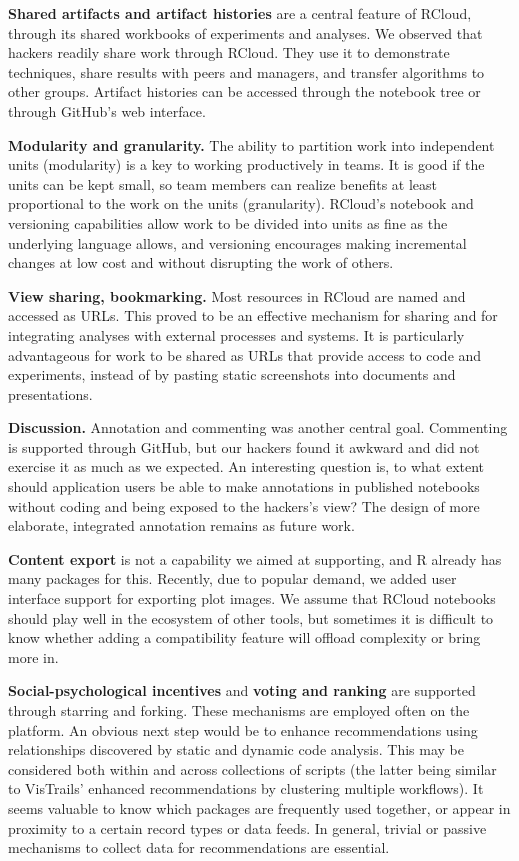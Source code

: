 {\bf Shared artifacts and artifact histories} are a central feature of
RCloud, through its shared workbooks of experiments and analyses.  We
observed that hackers readily share work through RCloud. They use it to
demonstrate techniques, share results with peers and managers, and transfer algorithms
to other groups.  Artifact histories can be accessed through the notebook
tree or through GitHub's web interface.

{\bf Modularity and granularity.} The ability to partition work into
independent units (modularity) is a key to working productively in teams.
It is good if the units can be kept small, so team members can realize
benefits at least proportional to the work on the units (granularity).
RCloud's notebook and versioning capabilities allow work to be divided
into units as fine as the underlying language allows, and versioning
encourages making incremental changes at low cost and without disrupting
the work of others.

{\bf View sharing, bookmarking.} Most resources in RCloud are named
and accessed as URLs. This proved to be an effective mechanism for
sharing and for integrating analyses with external processes and systems.
It is particularly advantageous for work to be shared as URLs that
provide access to code and experiments, instead of by pasting static
screenshots into documents and presentations.

{\bf Discussion.} Annotation and commenting was another central goal.
Commenting is supported through GitHub, but our hackers found it
awkward and did not exercise it as much as we expected.
An interesting question is, to what extent should application users
be able to make annotations in published notebooks without coding
and being exposed to the hackers's view? The design of
more elaborate, integrated annotation remains as future work.

{\bf Content export} is not a capability we aimed at supporting,
and R already has many packages for this. Recently, due to popular
demand, we added user interface support for exporting plot images.
We assume that RCloud notebooks should play well in the ecosystem
of other tools, but sometimes it is difficult to know whether adding
a compatibility feature will offload complexity or bring more in.

{\bf Social-psychological incentives} and {\bf voting and ranking} are
supported through starring and forking. These mechanisms are employed often
on the platform. An obvious next step would be to enhance recommendations
using relationships discovered by static and dynamic code analysis. This
may be considered both within and across collections of scripts (the latter
being similar to VisTrails' enhanced recommendations by clustering multiple
workflows).  It seems valuable to know which packages are frequently used
together, or appear in proximity to a certain record types or data feeds.
In general, trivial or passive mechanisms to collect data for
recommendations are essential.

